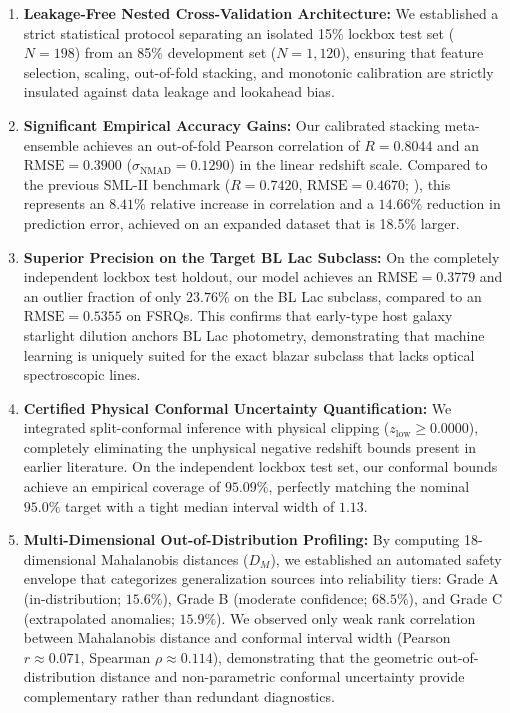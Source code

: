 \documentclass[twocolumn,linenumbers,floatfix]{aastex701}
\begin{document}
\begin{enumerate}
    \item \textbf{Leakage-Free Nested Cross-Validation Architecture:} We established a strict statistical protocol separating an isolated 15\% lockbox test set ($N=198$) from an 85\% development set ($N=1,120$), ensuring that feature selection, scaling, out-of-fold stacking, and monotonic calibration are strictly insulated against data leakage and lookahead bias.
    
    \item \textbf{Significant Empirical Accuracy Gains:} Our calibrated stacking meta-ensemble achieves an out-of-fold Pearson correlation of $R = 0.8044$ and an $\text{RMSE} = 0.3900$ ($\sigma_{\text{NMAD}} = 0.1290$) in the linear redshift scale. Compared to the previous SML-II benchmark ($R = 0.7420$, $\text{RMSE} = 0.4670$; \citealt{Narendra2022}), this represents an $8.41\%$ relative increase in correlation and a $14.66\%$ reduction in prediction error, achieved on an expanded dataset that is 18.5\% larger.
    
    \item \textbf{Superior Precision on the Target BL Lac Subclass:} On the completely independent lockbox test holdout, our model achieves an $\text{RMSE} = 0.3779$ and an outlier fraction of only $23.76\%$ on the BL Lac subclass, compared to an $\text{RMSE} = 0.5355$ on FSRQs. This confirms that early-type host galaxy starlight dilution anchors BL Lac photometry, demonstrating that machine learning is uniquely suited for the exact blazar subclass that lacks optical spectroscopic lines.
    
    \item \textbf{Certified Physical Conformal Uncertainty Quantification:} We integrated split-conformal inference with physical clipping ($z_{\text{low}} \ge 0.0000$), completely eliminating the unphysical negative redshift bounds present in earlier literature. On the independent lockbox test set, our conformal bounds achieve an empirical coverage of $95.09\%$, perfectly matching the nominal $95.0\%$ target with a tight median interval width of $1.13$.
    
    \item \textbf{Multi-Dimensional Out-of-Distribution Profiling:} By computing 18-dimensional Mahalanobis distances ($D_M$), we established an automated safety envelope that categorizes generalization sources into reliability tiers: Grade A (in-distribution; $15.6\%$), Grade B (moderate confidence; $68.5\%$), and Grade C (extrapolated anomalies; $15.9\%$). We observed only weak rank correlation between Mahalanobis distance and conformal interval width (Pearson $r \approx 0.071$, Spearman $\rho \approx 0.114$), demonstrating that the geometric out-of-distribution distance and non-parametric conformal uncertainty provide complementary rather than redundant diagnostics.
    

\end{enumerate}
\end{document}
